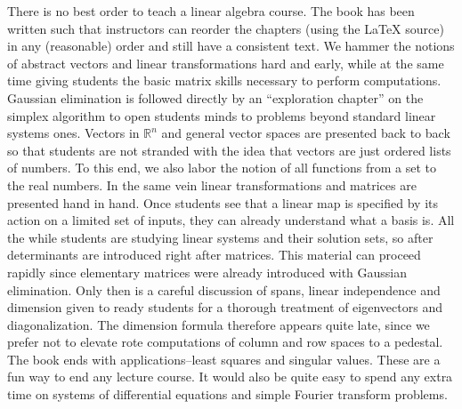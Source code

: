 There is no best order to teach a linear algebra course. The book has been written such that instructors can reorder the chapters (using the LaTeX source) in any (reasonable) order and still have a consistent text. We hammer the notions of abstract vectors and linear transformations hard and  early, while at the same time giving students the basic matrix skills necessary to perform computations.
Gaussian elimination is followed directly by an ``exploration chapter'' on the simplex algorithm to open students minds to problems 
beyond standard linear systems ones. Vectors in ${\mathbb R}^n$ and general vector spaces are presented back to back so that students
are not stranded with the idea that vectors are just ordered lists of numbers. To this end, we also labor the notion of all functions from a set to 
the real numbers. In the same vein linear transformations and matrices are presented hand in hand. Once students see that a linear map
is specified by its action on a limited set of inputs, they can already understand what a basis is.
All the while students are studying linear systems and their solution sets, so after determinants are introduced right after  matrices.
This material can proceed rapidly since elementary matrices were already introduced with Gaussian elimination. Only then is a careful 
discussion of spans, linear independence and dimension given to ready students for a thorough treatment of eigenvectors and
diagonalization. The dimension formula therefore appears quite late, since we prefer not to elevate rote computations of column and
row spaces to a pedestal. The book ends with applications--least squares and singular values. These are a fun way to end any lecture course.
It would also be quite easy to spend any extra time on systems of differential equations and simple Fourier transform problems.

